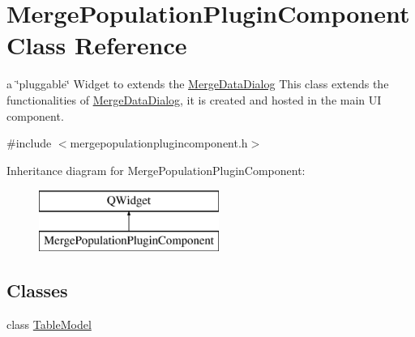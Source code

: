 \hypertarget{class_merge_population_plugin_component}{}\section{Merge\+Population\+Plugin\+Component Class Reference}
\label{class_merge_population_plugin_component}


a \char`\"{}pluggable\char`\"{} Widget to extends the \mbox{\hyperlink{class_merge_data_dialog}{Merge\+Data\+Dialog}} This class extends the functionalities of \mbox{\hyperlink{class_merge_data_dialog}{Merge\+Data\+Dialog}}, it is created and hosted in the main UI component.  




{\ttfamily \#include $<$mergepopulationplugincomponent.\+h$>$}

Inheritance diagram for Merge\+Population\+Plugin\+Component\+:\begin{figure}[H]
\begin{center}
\leavevmode
\includegraphics[height=2.000000cm]{d5/d26/class_merge_population_plugin_component}
\end{center}
\end{figure}
\subsection*{Classes}
\begin{DoxyCompactItemize}
\item 
class \mbox{\hyperlink{class_merge_population_plugin_component_1_1_table_model}{Table\+Model}}
\end{DoxyCompactItemize}
